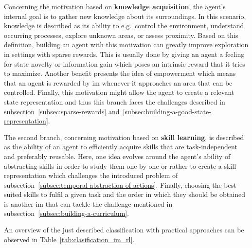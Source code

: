 \documentclass[draft,final]{vutinfth} %
\begin{document}
    Concerning the motivation based on \textbf{knowledge acquisition}, the agent's internal goal is to gather new knowledge about its surroundings.
    In this scenario, knowledge is described as its ability to e.g.\ control the environment, understand occurring processes, explore unknown areas, or assess proximity.
    Based on this definition, building an agent with this motivation can greatly improve exploration in settings with sparse rewards.
    This is usually done by giving an agent a feeling for state novelty or information gain which poses an intrinsic reward that it tries to maximize.
    Another benefit presents the idea of empowerment which means that an agent is rewarded by \gls{im} whenever it approaches an area that can be controlled.
    Finally, this motivation might allow the agent to create a relevant state representation and thus this branch faces the challenges described in subsection~\ref{subsec:sparse-rewards} and~\ref{subsec:building-a-good-state-representation}.

    The second branch, concerning motivation based on \textbf{skill learning}, is described as the ability of an agent to efficiently acquire skills that are task-independent and preferably reusable.
    Here, one idea evolves around the agent's ability of abstracting skills in order to study them one by one or rather to create a skill representation which challenges the introduced problem of subsection~\ref{subsec:temporal-abstraction-of-actions}.
    Finally, choosing the best-suited skills to fulfil a given task and the order in which they should be obtained is another \gls{im} that can tackle the challenge mentioned in subsection~\ref{subsec:building-a-curriculum}.

    An overview of the just described classification with practical approaches can be observed in Table~\ref{tab:clasification_im_rl}.
\end{document}
